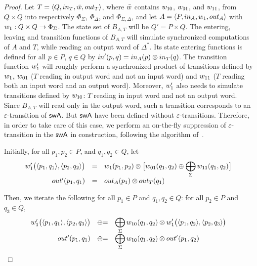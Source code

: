 \begin{proof}
Let $T = \< Q, \init_T, \bar{\wei}, \final_T >$,
where $\bar{\wei}$ contains $\wei_{10}$, $\wei_{01}$, and $\wei_{11}$,
from $Q \times Q$ into respectively
$\Phi_{\Sigma}$, $\Phi_{\Delta}$, and $\Phi_{\Sigma, \Delta}$,
and let $A = \< P, \init_A, \wei_1, \final_A >$
with $\wei_1: Q \times Q \to \Phi_{\Sigma}$.
%
\noindent
The state set of $B_{A, T}$ will be $Q' = P \times Q$.
The entering, leaving and transition functions of $B_{A, T}$ will
simulate synchronized computations of $A$ and $T$,
while reading an output word of $\Delta^*$.
%
Its state entering functions is defined
for all $p \in P$, $q \in Q$
by $\init'(p, q) = \init_A(p) \otimes \init_T(q)$.
The transition function $\wei'_1$ will roughly perform
a synchronized product of transitions defined by $\wei_1$,
$\wei_{01}$ ($T$ reading in output word and not an input word)
and $\wei_{11}$ ($T$ reading both an input word and an output word).
%
Moreover, $\wei'_1$ also needs to simulate transitions
defined by $\wei_{10}$: $T$ reading in input word and not an output word.
Since $B_{A, T}$  will read only in the output word, such a transition corresponds
to an $\varepsilon$-transition of $\textsf{swA}$.
But $\textsf{swA}$ have been defined without $\varepsilon$-transitions.
Therefore, in order to take care of this case, we perform an on-the-fly
suppression of $\varepsilon$-transition in the $\textsf{swA}$ in construction,
following the algorithm of~\cite{LombardySakarovitch12ciaa}.
%


\noindent
Initially, for all $p_1, p_2 \in P$, and $q_1, q_2 \in Q$, let
\[
\begin{array}{rcl}
\wei'_1\bigl( \< p_1, q_1>, \< p_2, q_2>\bigr) & = & 
\wei_1(p_1, p_2) \otimes
\bigl[
\wei_{01}(q_1, q_2)
\oplus
\displaystyle\bigoplus_{\Sigma}
\wei_{11}(q_1, q_2)
\bigr]\\
\final'(p_1, q_1) & = & \final_A(p_1) \otimes \final_T(q_1)
\end{array}
\]

\noindent
Then, we iterate the following for all $p_1\in P$ and $q_1, q_2 \in Q$:
for all $p_2\in P$ and $q_3 \in Q$,
\[
\begin{array}{rcl}
\wei'_1\bigl( \< p_1, q_1>, \< p_2, q_3>\bigr) & \opluseq & 
\displaystyle\bigoplus_{\Sigma} \wei_{10}(q_1, q_2)
\otimes
\wei'_1\bigl( \< p_1, q_2>, \< p_2, q_3>\bigr)\\
\final'(p_1, q_1) & \opluseq & 
\displaystyle\bigoplus_{\Sigma} \wei_{10}(q_1, q_2)
\otimes \final'(p_1, q_2)
\end{array}
\]
\end{proof}

